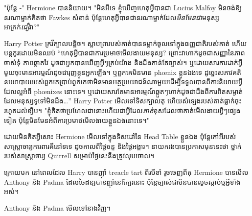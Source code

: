 "ប៉ុន្តែ -" Hermione បាននិយាយ។ "មិនអីទេ ខ្ញុំឃើញហេតុអ្វីបានជា Lucius Malfoy មិនចង់ឱ្យនរណាម្នាក់គិតថា Fawkes សំខាន់ ប៉ុន្តែហេតុអ្វីបានជានរណាម្នាក់ដែល\emph{មិនមែនជា}មនុស្សអាក្រក់\emph{ជឿ}វា?"

Harry Potter គ្រវីក្បាលបន្តិច។ ស្លាបព្រារបស់គាត់បានទម្លាក់ចូលទៅក្នុងធញ្ញជាតិរបស់គាត់ ហើយបន្តកូរដោយមិនឈប់ “ហេតុអ្វីបានជាការប្រមាថមើលងាយមនុស្ស? ព្រោះវាហាក់ដូចជាសញ្ញានៃភាពចាស់ទុំ ភាពឆ្លាតវៃ ដូចជាអ្នកបានឃើញអ្វីៗគ្រប់យ៉ាង និងដឹងកាន់តែច្បាស់។ ឬ​ដោយ​សារ​ការ​ដាក់​អ្វី​មួយ​ចុះ​មាន​អារម្មណ៍​ដូច​ជា​រុញ​ខ្លួន​អ្នក​ឡើង។ ឬពួកគេមិនមាន phœnix ខ្លួនឯងទេ ដូច្នេះសភាវគតិនយោបាយរបស់ពួកគេប្រាប់ពួកគេថាមិនមានអត្ថប្រយោជន៍ណាមួយដើម្បីទទួលបានពីការនិយាយអ្វីដែលល្អអំពី phœnixes នោះទេ។ ឬ​ដោយ​សារ​តែ​មាន​អារម្មណ៍​ឆ្កួត​ៗ​ហាក់​ដូច​ជា​ដឹង​ពី​ការ​ពិត​សម្ងាត់​ដែល​មនុស្ស​ទូទៅ​មិន​ដឹង…” Harry Potter មើល​ទៅ​ទិស​ក្បាល​តុ ហើយ​សំឡេង​របស់​គាត់​ធ្លាក់​ចុះ​រហូត​ដល់​ខ្សឹប។ "ខ្ញុំគិតថាប្រហែលជានោះហើយជាអ្វីដែល\emph{គាត់}ខុសដែលថាគាត់មើលងាយអ្វីៗផ្សេងទៀត ប៉ុន្តែមិនមែនអំពីការប្រមាថមើលងាយខ្លួនឯងនោះទេ។"

ដោយមិនគិតអ្វីសោះ Hermione មើលទៅក្នុងទិសដៅនៃ Head Table ខ្លួនឯង ប៉ុន្តែកៅអីរបស់សាស្ត្រាចារ្យការពារគឺនៅទទេ ដូចកាលពីថ្ងៃចន្ទ និងថ្ងៃអង្គារ។ នាយករងបានប្រកាសមុននេះថា ថ្នាក់របស់សាស្រ្តាចារ្យ Quirrell សម្រាប់ថ្ងៃនេះនឹងត្រូវលុបចោល។

ក្រោយមក នៅពេលដែល Harry បានញ៉ាំ treacle tart ពីរបីខាំ រួចចេញពីតុ Hermione បានមើល Anthony និង Padma ដែលចៃដន្យបានញ៉ាំនៅក្បែរនោះ ប៉ុន្តែច្បាស់ជាមិនបានលួចស្តាប់ឬអ្វីទាំងអស់។

Anthony និង Padma មើលទៅនាងវិញ។

